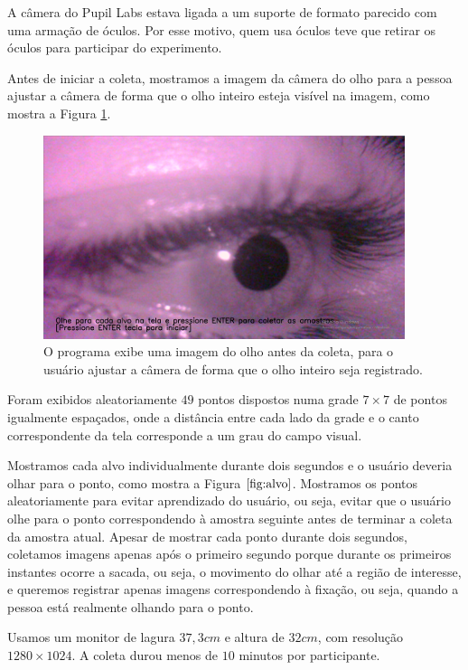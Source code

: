 A câmera do Pupil Labs estava ligada a um suporte de formato parecido com uma armação de óculos. Por esse motivo, quem usa óculos teve que retirar os óculos para participar do experimento.

Antes de iniciar a coleta, mostramos a imagem da câmera do olho para a pessoa ajustar a câmera de forma que o olho inteiro esteja visível na imagem, como mostra a Figura \ref{fig:ajustando_olho}.

\begin{figure}
\centering
\includegraphics[scale=1]{imagens/ajustando_camera.png}
\caption{O programa exibe uma imagem do olho antes da coleta, para o usuário ajustar a câmera de forma que o olho inteiro seja registrado.}
\label{fig:ajustando_olho}
\end{figure}

Foram exibidos aleatoriamente $49$ pontos dispostos numa grade $7 \times 7$ de pontos igualmente espaçados, onde a distância entre cada lado da grade e o canto correspondente da tela corresponde a um grau do campo visual.

Mostramos cada alvo individualmente durante dois segundos e o usuário deveria olhar para o ponto, como mostra a Figura $\ref{fig:alvo}$. Mostramos os pontos aleatoriamente para evitar aprendizado do usuário, ou seja, evitar que o usuário olhe para o ponto correspondendo à amostra seguinte antes de terminar a coleta da amostra atual. Apesar de mostrar cada ponto durante dois segundos, coletamos imagens apenas após o primeiro segundo porque durante os primeiros instantes ocorre a sacada, ou seja, o movimento do olhar até a região de interesse, e queremos registrar apenas imagens correspondendo à fixação, ou seja, quando a pessoa está realmente olhando para o ponto.

Usamos um monitor de lagura $37,3cm$ e altura de $32cm$, com resolução $1280 \times 1024$. A coleta durou menos de $10$ minutos por participante.

